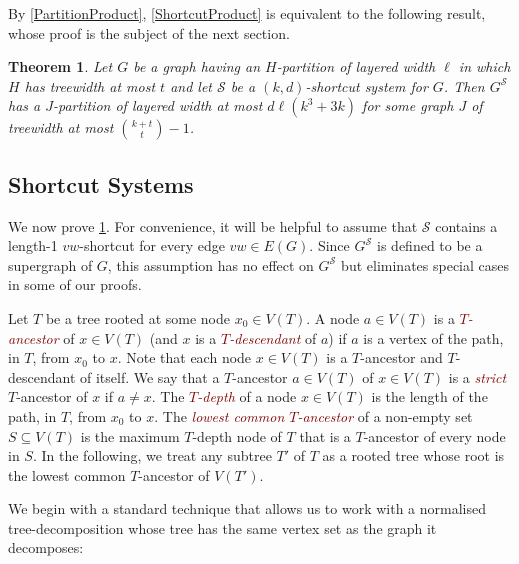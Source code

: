 \documentclass{patmorin}
\theoremstyle{plain}
\newtheorem{thm}{Theorem}
\theoremstyle{definition}
\newcommand{\defin}[1]{\textcolor{Maroon}{\emph{#1}}}
\newcommand{\note}[2]{\noindent{\color{red}[#1:~#2]}}
\renewcommand{\SS}{\mathcal{S}}
\begin{document}
By \cref{PartitionProduct}, \cref{ShortcutProduct} is equivalent to the following result, whose proof is the subject of the next section.

\begin{thm}
	\label{ShortcutPartition}
	Let $G$ be a graph having an $H$-partition of layered width $\ell$ in which $H$ has treewidth at most $t$ and let $\SS$ be a $(k,d)$-shortcut system for $G$.  Then $G^\SS$ has a $J$-partition of layered width at most $d\ell(k^3+3k)$ for some graph $J$ of treewidth at most $\binom{k+t}{t}-1$.
\end{thm}


\subsection{Shortcut Systems}

We now prove \cref{ShortcutPartition}.
For convenience, it will be helpful to assume that $\SS$ contains a length-1 $vw$-shortcut for every edge $vw\in E(G)$.  Since $G^\SS$ is defined to be a supergraph of $G$, this assumption has no effect on $G^{\SS}$ but eliminates special cases in some of our proofs.

Let $T$ be a tree rooted at some node $x_0\in V(T)$.  A node $a\in V(T)$ is a \defin{$T$-ancestor} of $x\in V(T)$ (and $x$ is a \defin{$T$-descendant} of $a$) if $a$ is a vertex of the path, in $T$, from $x_0$ to $x$.  Note that each node $x\in V(T)$ is a $T$-ancestor and $T$-descendant of itself.  We say that a $T$-ancestor $a\in V(T)$ of $x\in V(T)$ is a \defin{strict} $T$-ancestor of $x$ if $a\neq x$.
The \defin{$T$-depth} of a node $x\in V(T)$ is the length of the path, in $T$, from $x_0$ to $x$.  The \defin{lowest common $T$-ancestor} of a non-empty set $S\subseteq V(T)$ is the maximum $T$-depth node of $T$ that is a $T$-ancestor of every node in $S$.  In the following, we treat any subtree $T'$ of $T$ as a rooted tree whose root is the lowest common $T$-ancestor of $V(T')$.





We begin with a standard technique that allows us to work with a normalised tree-decomposition whose tree has the same vertex set as the graph it decomposes:
\end{document}
